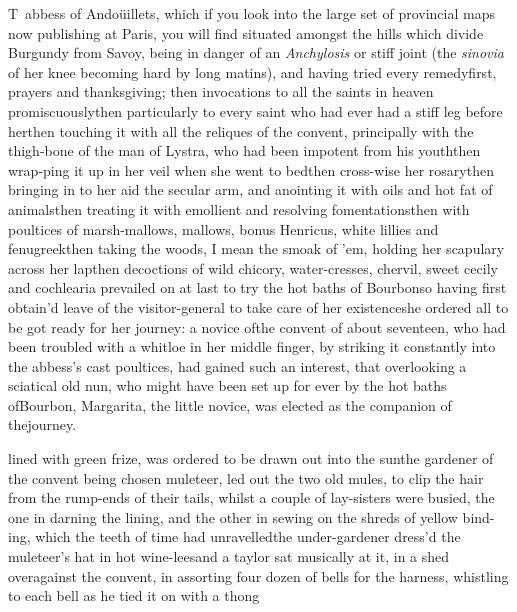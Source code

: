 \documentclass{article}
\begin{document}
\lettrine{T}{\,} abbess of Andoüillets, which if you look into the large set of
provincial maps now publishing at Paris, you will find situated amongst the
hills which divide Burgundy from Savoy, being in danger of an
\textit{Anchylosis} or stiff joint (the \textit{sinovia} of her knee becoming hard
by long matins), and having tried every remedy\tsh first, prayers and thanksgiving;
then invocations to all the saints in heaven promiscuously\tsh then particularly to
every saint who had ever had a stiff leg before her\tsh then touching it with all
the reliques of the convent, principally with the thigh-bone of the man of
Lystra, who had been impotent from his youth\tsh then wrap-\pb ping it up in
her veil when she went to bed\tsk then cross-wise her rosary\tsk then bringing in to her
aid the secular arm, and anointing it with oils and hot fat of animals\tsh then
treating it with emollient and resolving fomentations\tsh then with poultices of
marsh-mallows, mallows, bonus Henricus, white lillies and fenugreek\tsk then taking
the woods, I mean the smoak of ’em, holding her scapulary across her lap\tsh then
decoctions of wild chicory, water-cresses, chervil, sweet cecily and cochlearia\tsh
{} 
prevailed on at last to try the hot baths
of Bourbon\tsh so having first obtain’d leave of the visitor-general to
take care of her existence\tsk she ordered all to be got ready for her journey: a
novice of\pb the convent of about seventeen, who had been troubled with a whitloe in
her middle finger, by striking it constantly into the abbess’s cast poultices, \etc
\tsh had gained such an interest, that overlooking a sciatical old nun, who might have
been set up for ever by the hot baths of\break Bourbon, Margarita, the little
novice, was elected as the companion of the\break journey.

\noindent
{}\break lined with green frize,
was ordered to be drawn out into the sun\tsk the gardener of the
convent being chosen muleteer, led out the two old mules, to clip
the hair from the rump-ends of their tails, whilst a couple of
lay-sisters were busied, the one in darning the lining, and the
other in sewing on the shreds of yellow bind-\pb ing, which the teeth of
time had unravelled\tsh the under-gardener dress’d
the muleteer’s hat in hot wine-lees\tsh and a taylor
sat musically at it, in a shed overagainst the convent, in
assorting four dozen of bells for the harness, whistling to each
bell as he tied it on with a thong\tsh
\end{document}
